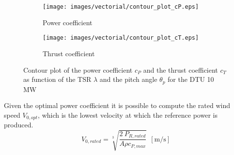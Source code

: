\begin{figure}[htb]
    \centering
    \begin{subfigure}{0.49\textwidth}
    \centering
    \texttt{[image: images/vectorial/contour\_plot\_cP.eps]}
    \caption{Power coefficient}
    \label{fig:contour_cp}
    \end{subfigure}
    \begin{subfigure}{0.49\textwidth}
    \centering
    \texttt{[image: images/vectorial/contour\_plot\_cT.eps]}
    \caption{Thrust coefficient}
    \label{fig:contour_cT}
    \end{subfigure}
    \caption{Contour plot of the power coefficient $c_P$ and  the thrust coefficient $c_T$ as function of the \acrlong{TSR} $\lambda$ and the pitch angle $\theta_p$ for the DTU 10 MW}
    \label{fig:contour_plot}
\end{figure}

Given the optimal power coefficient it is possible to compute the rated wind speed $V_{0,opt}$, which is the lowest velocity at which the reference power is produced.
\begin{equation}
    V_{0, rated} = \sqrt[3]{\frac{2 \ P_{R,rated}}{A \rho c_{P, max}}} \ \ \left[\si{\meter \per \second}\right]
\end{equation}

